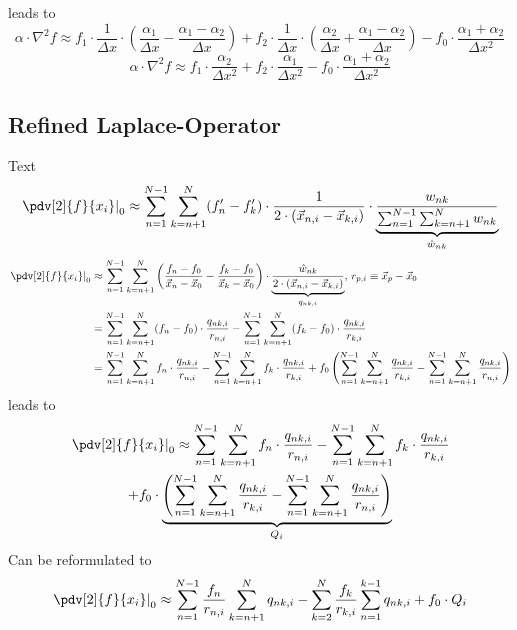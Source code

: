 leads to
\begin{equation}
	\alpha \cdot \nabla^2 f \approx f_1 \cdot \frac{1}{\Delta x} \cdot \left( \frac{\alpha_1}{\Delta x} - \frac{\alpha_1 - \alpha_2}{\Delta x} \right) + f_2 \cdot \frac{1}{\Delta x} \cdot \left( \frac{\alpha_2}{\Delta x} + \frac{\alpha_1 - \alpha_2}{ \Delta x} \right) - f_0 \cdot \frac{\alpha_1  + \alpha_2}{ \Delta x^2}
\end{equation}
\begin{equation}
	\alpha \cdot \nabla^2 f \approx f_1 \cdot \frac{\alpha_2}{\Delta x^2} + f_2 \cdot \frac{\alpha_1}{\Delta x^2} - f_0 \cdot \frac{\alpha_1  + \alpha_2}{ \Delta x^2}
\end{equation}

\subsection{Refined Laplace-Operator}
Text
\begin{equation}
	\left.\pdv[2]{f}{x_i}\right|_0 \approx \sum_{n = 1}^{N - 1} \sum_{k = n +1}^{N} (f'_n - f'_k) \cdot \frac{1}{2 \cdot (\vec{x}_{n, i} - \vec{x}_{k, i})} \cdot \underbrace{\frac{w_{nk}}{\sum_{n = 1}^{N - 1} \sum_{k = n +1}^{N}  w_{nk}}}_{\hat{w}_{nk}}
\end{equation}
\begin{align}
	\left.\pdv[2]{f}{x_i}\right|_0 &\approx \sum_{n = 1}^{N - 1} \sum_{k = n +1}^{N} \left(\frac{f_n - f_0}{\vec{x}_n - \vec{x}_0} - \frac{f_k - f_0}{\vec{x}_k - \vec{x}_0} \right) \cdot \underbrace{\frac{\hat{w}_{nk}}{2 \cdot (\vec{x}_{n, i} - \vec{x}_{k, i})}}_{q_{nk, i}}, \, r_{p, i} \equiv \vec{x}_p - \vec{x}_0\\
	&= \sum_{n = 1}^{N - 1} \sum_{k = n +1}^{N} (f_n - f_0) \cdot \frac{q_{nk, i}}{r_{n, i}}  - \sum_{n = 1}^{N - 1} \sum_{k = n +1}^{N}  (f_k - f_0) \cdot \frac{q_{nk, i}}{r_{k, i}} \\
	&= \sum_{n = 1}^{N - 1} \sum_{k = n +1}^{N} f_n \cdot \frac{q_{nk, i}}{r_{n, i}}  - \sum_{n = 1}^{N - 1} \sum_{k = n +1}^{N}  f_k  \cdot \frac{q_{nk, i}}{r_{k, i}} + f_0 \left( \sum_{n = 1}^{N - 1} \sum_{k = n +1}^{N} \frac{q_{nk, i}}{r_{k, i}} - \sum_{n = 1}^{N - 1} \sum_{k = n +1}^{N} \frac{q_{nk, i}}{r_{n, i}} \right)
\end{align}
leads to
\begin{multline}
	\left.\pdv[2]{f}{x_i}\right|_0 \approx \sum_{n = 1}^{N - 1} \sum_{k = n +1}^{N} f_n \cdot \frac{q_{nk, i}}{r_{n, i}}  - \sum_{n = 1}^{N - 1} \sum_{k = n +1}^{N}  f_k  \cdot \frac{q_{nk, i}}{r_{k, i}} \\
	+ f_0 \cdot \underbrace{\left( \sum_{n = 1}^{N - 1} \sum_{k = n +1}^{N} \frac{q_{nk, i}}{r_{k, i}}
	 - \sum_{n = 1}^{N - 1} \sum_{k = n +1}^{N} \frac{q_{nk, i}}{r_{n, i}} \right)}_{Q_i}
\end{multline}
Can be reformulated to
\begin{equation}
	\left.\pdv[2]{f}{x_i}\right|_0 \approx \sum_{n = 1}^{N - 1} \frac{f_n}{r_{n, i}} \sum_{k = n +1}^{N}  q_{nk, i}  - \sum_{k = 2}^{N} \frac{f_k}{r_{k, i}} \sum_{n = 1}^{k - 1}  q_{nk, i} + f_0 \cdot Q_i
\end{equation}
